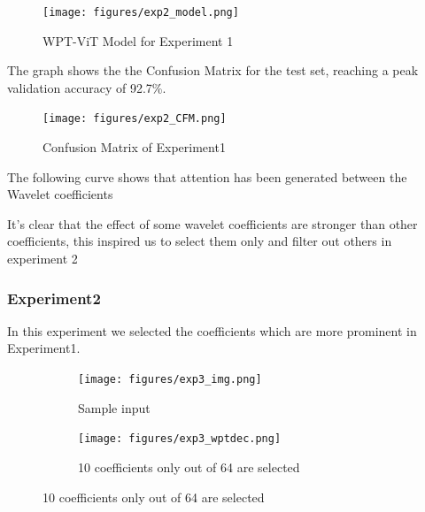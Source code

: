 \documentclass{svproc}
\begin{document}
\begin{figure}[H]
  \centering
    \texttt{[image: figures/exp2\_model.png]}
    \caption{WPT-ViT Model for Experiment 1}
    \label{fig:exp2_model}
\end{figure}

\noindent 
The graph shows the the Confusion Matrix for the test set, reaching a peak validation accuracy of 92.7\%.

\begin{figure}[H]
  \centering
    \texttt{[image: figures/exp2\_CFM.png]}
    \caption{Confusion Matrix of Experiment1}
    \label{fig:exp1_model}
\end{figure}

\noindent
The following curve shows that attention has been generated between the Wavelet coefficients

\noindent
It's clear that the effect of some wavelet coefficients are stronger than other coefficients, this inspired us to select them only and filter out others in experiment 2  

\subsubsection{Experiment2}
In this experiment we selected the coefficients which are more prominent in Experiment1.

\begin{figure}[H]
  \centering
  \begin{subfigure}{0.2\textwidth}
    \centering
    \texttt{[image: figures/exp3\_img.png]}
    \caption{Sample input}
    \label{fig:exp3_sub1}
  \end{subfigure}%

  \bigskip
  
  \begin{subfigure}{0.5\textwidth}
    \centering
    \texttt{[image: figures/exp3\_wptdec.png]}
    \caption{10 coefficients only out of 64 are selected}
    \label{fig:exp3_sub2}
  \end{subfigure}
\end{figure}
\end{document}
